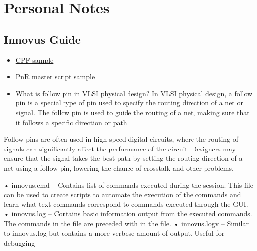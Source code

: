 \documentclass[a4paper]{article}
\begin{document}
\section{Personal Notes}
\label{sec:org6cbb1c5}

\subsection{Innovus Guide}
\label{sec:org1ff37fb}
\begin{itemize}
\item \href{./cpf\_sample.tcl}{CPF sample}
\item \href{./masterpnr.tcl}{PnR master script sample}

\item What is follow pin in VLSI physical design?
In VLSI physical design, a follow pin is a special type of pin used to
specify the routing direction of a net or signal. The follow pin is used
to guide the routing of a net, making sure that it follows a specific
direction or path.
\end{itemize}


Follow pins are often used in high-speed digital circuits, where the routing
of signals can significantly affect the performance of the circuit.
Designers may ensure that the signal takes the best path by setting
the routing direction of a net using a follow pin, lowering the chance of
crosstalk and other problems.

• innovus.cmd – Contains list of commands executed during the session. This file
can be used to create scripts to automate the execution of the commands and learn
what text commands correspond to commands executed through the GUI.
• innovus.log – Contains basic information output from the executed commands. The
commands in the file are preceded with in the file.
• innovus.logv – Similar to innovus.log but contains a more verbose amount of output. Useful for debugging
\end{document}

